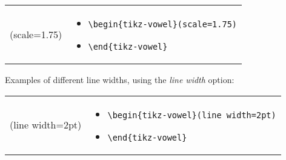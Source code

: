 \documentclass{article}
\begin{document}
\begin{center}
\begin{tabular}{rl}
  \begin{minipage}[t]{0.45\textwidth}
  \centering
	\begin{tikz-vowel}(scale=1.75)
	\end{tikz-vowel}
  \end{minipage} &
  \begin{minipage}[t]{0.2\textwidth}
  \vspace{-100pt}
  {\small
\begin{itemize}[label={}]
	\item \verb|\begin{tikz-vowel}(scale=1.75)|
	\item \verb|\end{tikz-vowel}|
\end{itemize}
    }
  \end{minipage}\\
\end{tabular}
\end{center}

\bigskip
\noindent
Examples of different line widths, using the \textit{line width} option:

\begin{center}
\begin{tabular}{rl}
  \begin{minipage}[t]{0.45\textwidth}
  \centering
	\begin{tikz-vowel}(line width=2pt)
	\end{tikz-vowel}
  \end{minipage} &
  \begin{minipage}[t]{0.2\textwidth}
  \vspace{-65pt}
  {\small
\begin{itemize}[label={}]
	\item \verb|\begin{tikz-vowel}(line width=2pt)|
	\item \verb|\end{tikz-vowel}|
\end{itemize}
    }
  \end{minipage}\\
\end{tabular}
\end{center}
\end{document}
